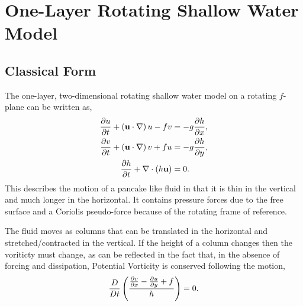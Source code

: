\documentclass[letterpaper,10pt,english]{sphinxmanual}
\begin{document}
\chapter{One-Layer Rotating Shallow Water Model}
\label{sw_intro::doc}\label{sw_intro:one-layer-rotating-shallow-water-model}

\section{Classical Form}
\label{sw_intro:classical-form}
The one-layer, two-dimensional rotating shallow water model on a
rotating \(f\)-plane can be written as,
\begin{gather}
\begin{split}\begin{aligned}
\frac{\partial u}{\partial t} + \left(\bf{u} \cdot \nabla\right) u - f v
&= - g \frac{\partial h}{\partial x},\\
\frac{\partial v}{\partial t} + \left(\bf{u} \cdot \nabla\right) v + f u
&= - g \frac{\partial h}{\partial y},\\
\frac{\partial h}{\partial t} + \nabla \cdot \left( h \bf{u} \right) &= 0.\end{aligned}\end{split}\notag
\end{gather}
This describes the motion of a pancake like fluid in that it is thin in
the vertical and much longer in the horizontal. It contains pressure
forces due to the free surface and a Coriolis pseudo-force because of
the rotating frame of reference.

The fluid moves as columns that can be translated in the horizontal and
stretched/contracted in the vertical. If the height of a column changes
then the voriticty must change, as can be reflected in the fact that, in
the absence of forcing and dissipation, Potential Vorticity is conserved
following the motion,
\begin{gather}
\begin{split}\frac{D}{Dt} \left(
\frac{ \frac{\partial v}{\partial x} - \frac{\partial u}{\partial y} + f }{h} \right) = 0.\end{split}\notag
\end{gather}
\end{document}
